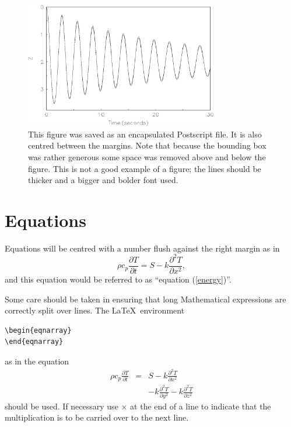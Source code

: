 \documentclass[twocolumn]{afmc_art}
\begin{document}
\begin{figure}[ht]
\centering
\includegraphics[width=0.75\textwidth]{fig.eps}
\caption{This figure was saved as an encapsulated Postscript file. It is also centred between the 
margins. Note that because the bounding box was rather generous some
space was removed above and below the figure. This is not a good example
of a figure; the lines should be thicker and a bigger and bolder font
used.}
\end{figure}

\section{Equations}
Equations will be centred with a number flush against the right margin
as in
\begin{equation}\label{energy}
\rho c_p\frac{\partial T}{\partial t}=S-k\frac{\partial^2 T}{\partial x^2},
\end{equation}
and this equation would be referred to as ``equation (\ref{energy})''.

Some care should be taken in ensuring that long Mathematical
expressions are correctly split over lines. The \LaTeX\ environment
\begin{verbatim}
\begin{eqnarray}
\end{eqnarray}
\end{verbatim}
as in the equation
\begin{eqnarray}
\rho c_p\frac{\partial T}{\partial t}
&=&
S-k\frac{\partial^2 T}{\partial x^2}
\nonumber\\
& &
- k\frac{\partial^2 T}{\partial y^2}
- k\frac{\partial^2 T}{\partial z^2}
\label{11}
\end{eqnarray}
should be used. If necessary use $\times$ at the end of a line to
indicate that the multiplication is to be carried over to the next
line.
\end{document}
